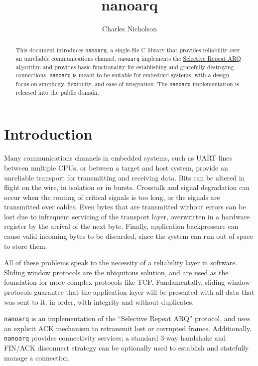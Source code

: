 \documentclass[11pt]{article}
\begin{document}
\title{nanoarq}
\author{Charles Nicholson}
\maketitle

\begin{abstract}
This document introduces \texttt{nanoarq}, a single-file C library that provides reliability over an unreliable communications channel. \texttt{nanoarq} implements the \href{https://en.wikipedia.org/wiki/Selective_Repeat_ARQ}{Selective Repeat ARQ}  algorithm and provides basic functionality for establishing and gracefully destroying connections. \texttt{nanoarq} is meant to be suitable for embedded systems, with a design focus on simplicity, flexibility, and ease of integration. The \texttt{nanoarq} implementation is released into the public domain.
\end{abstract}

\section{Introduction}
Many communications channels in embedded systems, such as UART lines between multiple CPUs, or between a target and host system, provide an unreliable transport for transmitting and receiving data. Bits can be altered in flight on the wire, in isolation or in bursts. Crosstalk and signal degradation can occur when the routing of critical signals is too long, or the signals are transmitted over cables. Even bytes that are transmitted without errors can be lost due to infrequent servicing of the transport layer, overwritten in a hardware register by the arrival of the next byte. Finally, application backpressure can cause valid incoming bytes to be discarded, since the system can run out of space to store them. \par
All of these problems speak to the necessity of a reliability layer in software. Sliding window protocols are the ubiquitous solution, and are used as the foundation for more complex protocols like TCP. Fundamentally, sliding window protocols guarantee that the application layer will be presented with all data that was sent to it, in order, with integrity and without duplicates. \par
\texttt{nanoarq} is an implementation of the \enquote{Selective Repeat ARQ} protocol, and uses an explicit ACK mechanism to retransmit lost or corrupted frames. Additionally, \texttt{nanoarq} provides connectivity services; a standard 3-way handshake and FIN/ACK disconnect strategy can be optionally used to establish and statefully manage a connection.
\end{document}
